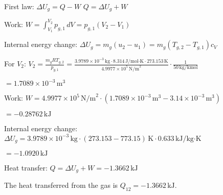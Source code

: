 First law: \( \Delta U_{g} = Q - W \)  
\( Q = \Delta U_{g} + W \)  

Work:  
\( W = \int_{V_{1}}^{V_{2}} p_{g,1} \, dV = p_{g,1} (V_{2} - V_{1}) \)  

Internal energy change:  
\( \Delta U_{g} = m_{g} (u_{2} - u_{1}) = m_{g} (T_{g,2} - T_{g,1}) c_{V} \)  

For \( V_{2} \):  
\( V_{2} = \frac{m_{g} R T_{g,2}}{p_{g,1}} = \frac{3.9789 \times 10^{-3} \, \text{kg} \cdot 8.314 \, \text{J/mol·K} \cdot 273.153 \, \text{K}}{4.9977 \times 10^5 \, \text{N/m}^2} \cdot \frac{1}{50 \, \text{kg/kmol}} \)  

\( = 1.7089 \times 10^{-3} \, \text{m}^3 \)  

Work:  
\( W = 4.9977 \times 10^5 \, \text{N/m}^2 \cdot (1.7089 \times 10^{-3} \, \text{m}^3 - 3.14 \times 10^{-3} \, \text{m}^3) \)  

\( = -0.28762 \, \text{kJ} \)  

Internal energy change:  
\( \Delta U_{g} = 3.9789 \times 10^{-3} \, \text{kg} \cdot (273.153 - 773.15) \, \text{K} \cdot 0.633 \, \text{kJ/kg·K} \)  

\( = -1.0920 \, \text{kJ} \)  

Heat transfer:  
\( Q = \Delta U_{g} + W = -1.3662 \, \text{kJ} \)  

The heat transferred from the gas is \( Q_{12} = -1.3662 \, \text{kJ} \).